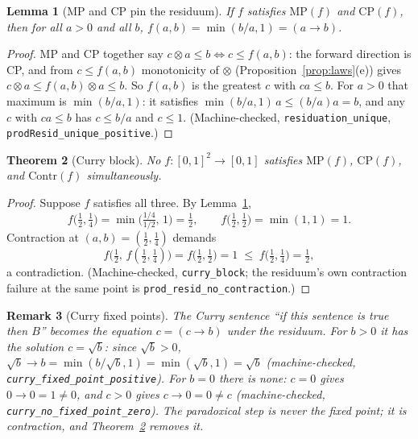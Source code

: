 \documentclass[11pt,a4paper]{article}
\newtheorem{theorem}{Theorem}[section]
\newtheorem{lemma}[theorem]{Lemma}
\newtheorem{remark}[theorem]{Remark}
\newcommand{\conjc}{\otimes}
\begin{document}
\begin{lemma}[MP and CP pin the residuum]
\label{lem:resid-unique}
If $f$ satisfies $\mathrm{MP}(f)$ and $\mathrm{CP}(f)$, then for all
$a > 0$ and all $b$,
$f(a,b) = \min(b/a, 1) = (a \to b)$.
\end{lemma}

\begin{proof}
MP and CP together say $c \conjc a \leq b \iff c \leq f(a,b)$:
the forward direction is CP, and from $c \leq f(a,b)$ monotonicity of
$\conjc$ (Proposition~\ref{prop:laws}(e)) gives
$c \conjc a \leq f(a,b) \conjc a \leq b$.
So $f(a,b)$ is the greatest $c$ with $ca \leq b$.
For $a > 0$ that maximum is $\min(b/a, 1)$:
it satisfies $\min(b/a,1)\,a \leq (b/a)a = b$, and any $c$ with
$ca \leq b$ has $c \leq b/a$ and $c \leq 1$.
(Machine-checked, \texttt{residuation\_unique},
\texttt{prodResid\_unique\_positive}.)
\end{proof}

\begin{theorem}[Curry block]
\label{thm:curry}
No $f : [0,1]^2 \to [0,1]$ satisfies $\mathrm{MP}(f)$,
$\mathrm{CP}(f)$, and $\mathrm{Contr}(f)$ simultaneously.
\end{theorem}

\begin{proof}
Suppose $f$ satisfies all three.
By Lemma~\ref{lem:resid-unique},
\[
f\bigl(\tfrac{1}{2}, \tfrac{1}{4}\bigr)
  = \min\bigl(\tfrac{1/4}{1/2},\, 1\bigr) = \tfrac{1}{2},
\qquad
f\bigl(\tfrac{1}{2}, \tfrac{1}{2}\bigr)
  = \min(1, 1) = 1.
\]
Contraction at $(a,b) = (\tfrac{1}{2}, \tfrac{1}{4})$ demands
\[
f\bigl(\tfrac{1}{2},\, f(\tfrac{1}{2}, \tfrac{1}{4})\bigr)
  = f\bigl(\tfrac{1}{2}, \tfrac{1}{2}\bigr)
  = 1
  \;\leq\;
  f\bigl(\tfrac{1}{2}, \tfrac{1}{4}\bigr)
  = \tfrac{1}{2},
\]
a contradiction.
(Machine-checked, \texttt{curry\_block}; the residuum's own
contraction failure at the same point is
\texttt{prod\_resid\_no\_contraction}.)
\end{proof}

\begin{remark}[Curry fixed points]
\label{rem:curry-fixed}
The Curry sentence ``if this sentence is true then $B$'' becomes the
equation $c = (c \to b)$ under the residuum.
For $b > 0$ it has the solution $c = \sqrt{b}$:
since $\sqrt{b} > 0$,
$\sqrt{b} \to b = \min(b/\sqrt{b}, 1) = \min(\sqrt{b}, 1) = \sqrt{b}$
(machine-checked, \texttt{curry\_fixed\_point\_positive}).
For $b = 0$ there is none: $c = 0$ gives $0 \to 0 = 1 \neq 0$, and
$c > 0$ gives $c \to 0 = 0 \neq c$
(machine-checked, \texttt{curry\_no\_fixed\_point\_zero}).
The paradoxical step is never the fixed point; it is contraction,
and Theorem~\ref{thm:curry} removes it.
\end{remark}
\end{document}
